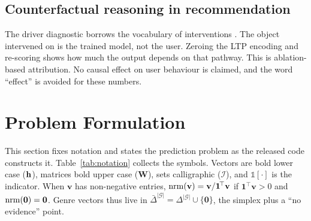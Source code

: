 \subsection{Counterfactual reasoning in recommendation}
The driver diagnostic borrows the vocabulary of interventions \cite{pearl2009causality}. The object intervened on is the trained model, not the user. Zeroing the LTP encoding and re-scoring shows how much the output depends on that pathway. This is ablation-based attribution. No causal effect on user behaviour is claimed, and the word ``effect'' is avoided for these numbers.

\section{Problem Formulation}
\label{sec:problem}
This section fixes notation and states the prediction problem as the released code constructs it. Table~\ref{tab:notation} collects the symbols. Vectors are bold lower case ($\mathbf{h}$), matrices bold upper case ($\mathbf{W}$), sets calligraphic ($\mathcal{I}$), and $\mathbb{1}[\cdot]$ is the indicator. When $\mathbf{v}$ has non-negative entries, $\operatorname{nrm}(\mathbf{v})=\mathbf{v}/\mathbf{1}^{\!\top}\mathbf{v}$ if $\mathbf{1}^{\!\top}\mathbf{v}>0$ and $\operatorname{nrm}(\mathbf{0})=\mathbf{0}$. Genre vectors thus live in $\bar{\Delta}^{|\mathcal{G}|}=\Delta^{|\mathcal{G}|}\cup\{\mathbf{0}\}$, the simplex plus a ``no evidence'' point.


